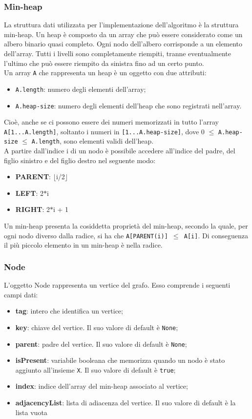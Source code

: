 \subsubsection{Min-heap}
La struttura dati utilizzata per l'implementazione dell'algoritmo è la struttura min-heap. Un heap è composto da un array che può essere considerato come un albero binario quasi completo. Ogni nodo dell'albero corrisponde a un elemento dell'array. Tutti i livelli sono completamente riempiti, tranne eventualmente l'ultimo che può essere riempito da sinistra fino ad un certo punto.\\
Un array \texttt{A} che rappresenta un heap è un oggetto con due attributi:
\begin{itemize}
	\item \texttt{A.length}: numero degli elementi dell'array;
	\item \texttt{A.heap-size}: numero degli elementi dell'heap che sono registrati nell'array.
\end{itemize}
Cioè, anche se ci possono essere dei numeri memorizzati in tutto l'array \texttt{A[1...A.length]}, soltanto i numeri in \texttt{[1...A.heap-size]}, dove 0 $\leq$ \texttt{A.heap-size} $\leq$ \texttt{A.length}, sono elementi validi dell'heap.\\
A partire dall'indice i di un nodo è possibile accedere all'indice del padre, del figlio sinistro e del figlio destro nel seguente modo:
\begin{itemize}
	\item \textbf{PARENT}: $\lfloor$i/2$\rfloor$ 
	\item \textbf{LEFT}: 2$\ast$i
	\item \textbf{RIGHT}: 2$\ast$i + 1
\end{itemize}
Un min-heap presenta la cosiddetta proprietà del min-heap, secondo la quale, per ogni nodo diverso dalla radice, si ha che \texttt{A[PARENT(i)] $\leq$ A[i]}. Di conseguenza il più piccolo elemento in un min-heap è nella radice.

\subsubsection{Node}
L'oggetto Node rappresenta un vertice del grafo. Esso comprende i seguenti campi dati:
\begin{itemize}
	\item \textbf{tag}: intero che identifica un vertice;
	\item \textbf{key}: chiave del vertice. Il suo valore di default è \texttt{None};
	\item \textbf{parent}: padre del vertice. Il suo valore di default è \texttt{None};
	\item \textbf{isPresent}: variabile booleana che memorizza quando un nodo è stato aggiunto all'insieme \texttt{X}. Il suo valore di default è \texttt{true};
	\item \textbf{index}: indice dell'array del min-heap associato al vertice; 
	\item \textbf{adjacencyList}: lista di adiacenza del vertice.
	Il suo valore di default è la lista vuota
\end{itemize}

